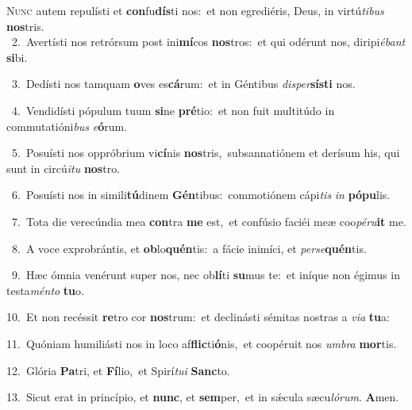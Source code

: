 \lettrine{\initial\textcolor{\initialcolor}{N}}{unc} autem repulísti et \textbf{con}\-fu\-\textbf{dís}\-ti nos:~\star et non egrediéris, Deus, in virtú\-\textit{ti}\-\textit{bus} \textbf{nos}\-tris.\\
{\numbfont\textcolor{\numbcolor}{~2.}}~Avertísti nos retrórsum post ini\-\textbf{mí}\-cos \textbf{nos}\-tros:~\star et qui odérunt nos, diripi\-\textit{é}\-\textit{bant} \textbf{si}\-bi.\par
{\numbfont\textcolor{\numbcolor}{~3.}}~Dedísti nos tamquam \textbf{o}\-ves es\-\textbf{cá}\-rum:~\star et in Géntibus \textit{di}\-\textit{sper}\textbf{sís}\textbf{ti} nos.\par
{\numbfont\textcolor{\numbcolor}{~4.}}~Vendidísti pópulum tuum \textbf{si}\-ne \textbf{pré}\-tio:~\star et non fuit multitúdo in commutatióni\textit{bus} \textit{e}\-\textbf{ó}rum.\par
{\numbfont\textcolor{\numbcolor}{~5.}}~Posuísti nos oppróbrium vi\-\textbf{cí}\-nis \textbf{nos}\-tris,~\star subsannatiónem et derísum his, qui sunt in circú\-\textit{i}\-\textit{tu} \textbf{nos}\-tro.\par
{\numbfont\textcolor{\numbcolor}{~6.}}~Posuísti nos in simili\-\textbf{tú}\-dinem \textbf{Gén}\-tibus:~\star commotiónem cápi\textit{tis} \textit{in} \textbf{pó}\-\textbf{pu}lis.\par
{\numbfont\textcolor{\numbcolor}{~7.}}~Tota die verecúndia mea \textbf{con}\-tra \textbf{me} est,~\star et confúsio faciéi meæ coo\-\textit{pé}\-\textit{ru}\textbf{it} me.\par
{\numbfont\textcolor{\numbcolor}{~8.}}~A voce exprobrántis, et \textbf{ob}\-lo\-\textbf{quén}\-tis:~\star a fácie inimíci, et \textit{per}\-\textit{se}\textbf{quén}tis.\par
{\numbfont\textcolor{\numbcolor}{~9.}}~Hæc ómnia venérunt super nos, nec ob\-\textbf{lí}\-ti \textbf{su}\-mus te:~\star et iníque non égimus in testa\-\textit{mén}\-\textit{to} \textbf{tu}\-o.\par
{\numbfont\textcolor{\numbcolor}{10.}}~Et non recéssit \textbf{re}\-tro cor \textbf{nos}\-trum:~\star et declinásti sémitas nostras a \textit{vi}\-\textit{a} \textbf{tu}\-a:\par
{\numbfont\textcolor{\numbcolor}{11.}}~Quóniam humiliásti nos in loco af\-\textbf{flic}\-ti\-\textbf{ó}\-nis,~\star et coopéruit nos \textit{um}\-\textit{bra} \textbf{mor}\-tis.\par
{\numbfont\textcolor{\numbcolor}{12.}}~Glória \textbf{Pa}\-tri, et \textbf{Fí}\-lio,~\star et Spirí\-\textit{tu}\-\textit{i} \textbf{Sanc}\-to.\par
{\numbfont\textcolor{\numbcolor}{13.}}~Sicut erat in princípio, et \textbf{nunc}\-, et \textbf{sem}\-per,~\star et in sǽcula sæcu\-\textit{ló}\-\textit{rum}. \textbf{A}\-men.\par
